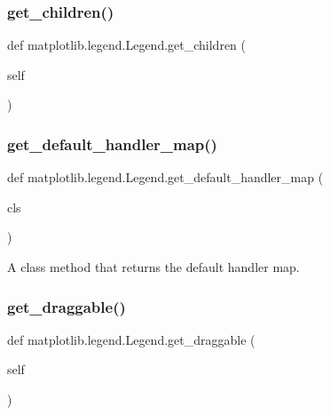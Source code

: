 \subsubsection{\texorpdfstring{get\+\_\+children()}{get\_children()}}
{\footnotesize\ttfamily def matplotlib.\+legend.\+Legend.\+get\+\_\+children (\begin{DoxyParamCaption}\item[{}]{self }\end{DoxyParamCaption})}

\mbox{\label{classmatplotlib_1_1legend_1_1Legend_a271fd31e4b7a106caa79559272b52d6c}} 
\subsubsection{\texorpdfstring{get\+\_\+default\+\_\+handler\+\_\+map()}{get\_default\_handler\_map()}}
{\footnotesize\ttfamily def matplotlib.\+legend.\+Legend.\+get\+\_\+default\+\_\+handler\+\_\+map (\begin{DoxyParamCaption}\item[{}]{cls }\end{DoxyParamCaption})}

\begin{DoxyVerb}A class method that returns the default handler map.
\end{DoxyVerb}
 \mbox{\label{classmatplotlib_1_1legend_1_1Legend_a2186965e28b02003c8ac0f75268c1a84}} 
\subsubsection{\texorpdfstring{get\+\_\+draggable()}{get\_draggable()}}
{\footnotesize\ttfamily def matplotlib.\+legend.\+Legend.\+get\+\_\+draggable (\begin{DoxyParamCaption}\item[{}]{self }\end{DoxyParamCaption})}

